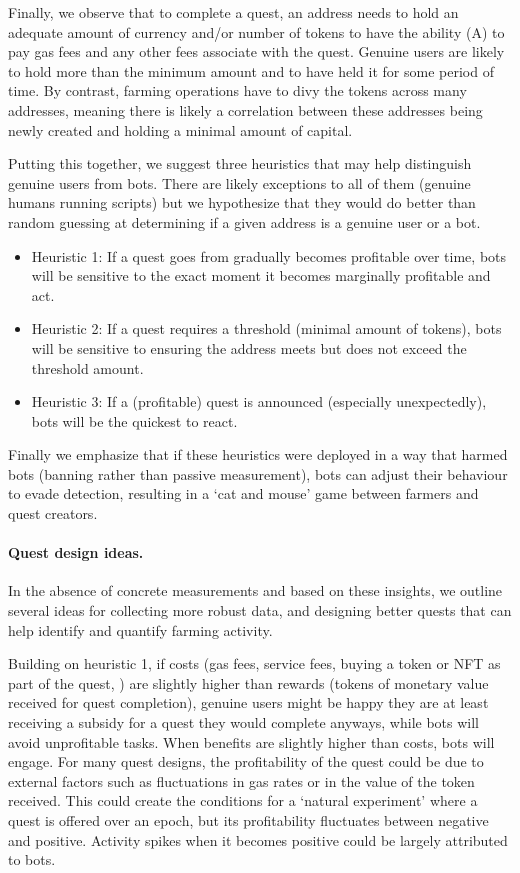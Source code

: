 Finally, we observe that to complete a quest, an address needs to hold an adequate amount of currency and/or number of tokens to have the ability (A) to pay gas fees and any other fees associate with the quest. Genuine users are likely to hold more than the minimum amount and to have held it for some period of time. By contrast, farming operations have to divy the tokens across many addresses, meaning there is likely a correlation between these addresses being newly created and holding a minimal amount of capital.

Putting this together, we suggest three heuristics that may help distinguish genuine users from bots. There are likely exceptions to all of them (\eg genuine humans running scripts) but we hypothesize that they would do better than random guessing at determining if a given address is a genuine user or a bot.

\begin{itemize}
\item Heuristic 1: If a quest goes from gradually becomes profitable over time, bots will be sensitive to the exact moment it becomes marginally profitable and act.\item Heuristic 2: If a quest requires a threshold (minimal amount of tokens), bots will be sensitive to ensuring the address meets but does not exceed the threshold amount. 
\item Heuristic 3: If a (profitable) quest is announced (especially unexpectedly), bots will be the quickest to react.
\end{itemize}

Finally we emphasize that if these heuristics were deployed in a way that harmed bots (\eg banning rather than passive measurement), bots can adjust their behaviour to evade detection, resulting in a `cat and mouse' game between farmers and quest creators. 

\paragraph{Quest design ideas.} In the absence of concrete measurements and based on these insights, we outline several ideas for collecting more robust data, and designing better quests that can help identify and quantify farming activity.

Building on heuristic 1, if costs (\ie gas fees, service fees, buying a token or NFT as part of the quest, \etc) are slightly higher than rewards (\ie tokens of monetary value received for quest completion), genuine users might be happy they are at least receiving a subsidy for a quest they would complete anyways, while bots will avoid unprofitable tasks. When benefits are slightly higher than costs, bots will engage. For many quest designs, the profitability of the quest could be due to external factors such as fluctuations in gas rates or in the value of the token received. This could create the conditions for a `natural experiment' where a quest is offered over an epoch, but its profitability fluctuates between negative and positive. Activity spikes when it becomes positive could be largely attributed to bots.

